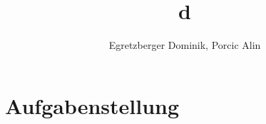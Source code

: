 \documentclass[a4paper]{article}
\title{d}
\author{Egretzberger Dominik, Porcic Alin}
\begin{document}
\section{Aufgabenstellung}
\end{document}
